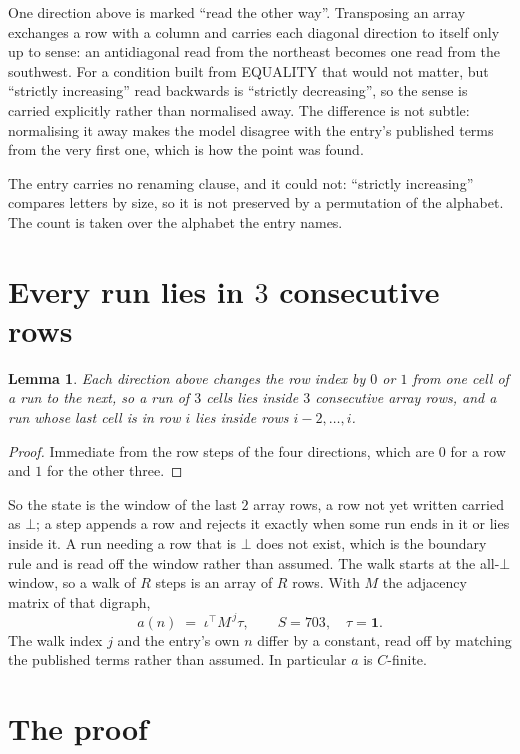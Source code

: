 \documentclass[11pt,a4paper]{article}
\theoremstyle{plain}
\newtheorem{lemma}[theorem]{Lemma}
\theoremstyle{definition}
\begin{document}
One direction above is marked ``read the other way''. Transposing an array exchanges a row with
a column and carries each diagonal direction to itself only up to sense: an antidiagonal read
from the northeast becomes one read from the southwest. For a condition built from EQUALITY
that would not matter, but ``strictly increasing'' read backwards is ``strictly decreasing'',
so the sense is carried explicitly rather than normalised away. The
difference is not subtle: normalising it away makes the model disagree with the entry's
published terms from the very first one, which is how the point was found.

The entry carries no renaming clause, and it could not: ``strictly increasing'' compares
letters by size, so it is not preserved by a permutation of the alphabet. The count is taken
over the alphabet the entry names.

\section{Every run lies in $3$ consecutive rows}

\begin{lemma}\label{lem:win}
Each direction above changes the row index by $0$ or $1$ from one cell of a run to the next, so
a run of $3$ cells lies inside $3$ consecutive array rows, and a run whose last cell is in
row $i$ lies inside rows $i-2,\dots,i$.
\end{lemma}

\begin{proof}
Immediate from the row steps of the four directions, which are $0$ for a row and $1$ for the
other three.
\end{proof}

So the state is the window of the last $2$ array rows, a row not yet written carried as
$\bot$; a step appends a row and rejects it exactly when some run ends in it or lies inside it.
A run needing a row that is $\bot$ does not exist, which is the boundary rule and is read off
the window rather than assumed. The walk starts at the all-$\bot$ window, so a walk of $R$ steps
is an array of $R$ rows. With $M$ the adjacency matrix of that digraph,
\[
a(n)\;=\;\iota^{\!\top}M^{\,j}\tau ,\qquad S=703,\quad\tau=\mathbf{1} .
\]
The walk index $j$ and the entry's own $n$ differ by a constant, read off by matching the
published terms rather than assumed. In particular $a$ is $C$-finite.

\section{The proof}
\end{document}
